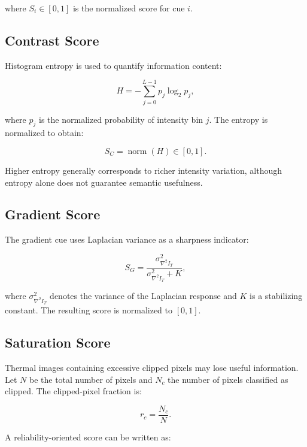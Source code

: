 \documentclass[conference]{IEEEtran}
\begin{document}
where $S_i\in[0,1]$ is the normalized score for cue $i$.

\subsection{Contrast Score}

Histogram entropy is used to quantify information content:

\begin{equation}
H=-\sum_{j=0}^{L-1}p_j\log_2 p_j,
\label{eq:entropy}
\end{equation}

where $p_j$ is the normalized probability of intensity bin $j$. The entropy is normalized to obtain:

\begin{equation}
S_C=\operatorname{norm}(H)\in[0,1].
\end{equation}

Higher entropy generally corresponds to richer intensity variation, although entropy alone does not guarantee semantic usefulness.

\subsection{Gradient Score}

The gradient cue uses Laplacian variance as a sharpness indicator:

\begin{equation}
S_G=\frac{\sigma_{\nabla^2 I_T}^{2}}
{\sigma_{\nabla^2 I_T}^{2}+K},
\label{eq:gradient}
\end{equation}

where $\sigma_{\nabla^2 I_T}^{2}$ denotes the variance of the Laplacian response and $K$ is a stabilizing constant. The resulting score is normalized to $[0,1]$.

\subsection{Saturation Score}

Thermal images containing excessive clipped pixels may lose useful information. Let $N$ be the total number of pixels and $N_c$ the number of pixels classified as clipped. The clipped-pixel fraction is:

\begin{equation}
r_c=\frac{N_c}{N}.
\label{eq:clip}
\end{equation}

A reliability-oriented score can be written as:
\end{document}
